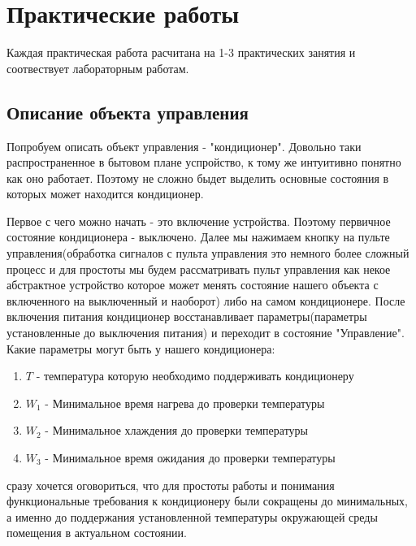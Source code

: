 \documentclass[12pt, twoside]{report}
\begin{document}
\newpage
\chapter*{Практические работы}\label{practical_works}

Каждая практическая работа расчитана на 1-3 практических занятия и соотвествует лабораторным работам.
\section*{Описание объекта управления}\label{practical_work_1}

Попробуем описать объект управления - "кондиционер". Довольно таки распространенное в бытовом плане успройство, к тому же
интуитивно понятно как оно работает. Поэтому не сложно быдет выделить основные состояния в которых может находится кондиционер.

Первое с чего можно начать - это включение устройства. Поэтому первичное состояние кондиционера - выключено. Далее мы нажимаем
кнопку на пульте управления(обработка сигналов с пульта управления это немного более сложный процесс и для простоты мы будем 
рассматривать пульт управления как некое абстрактное устройство которое может менять состояние нашего объекта с включенного на 
выключенный и наоборот) либо на самом кондиционере. После включения питания кондиционер восстанавливает параметры(параметры 
установленные до выключения питания) и переходит в состояние "Управление". Какие параметры могут быть у нашего кондиционера:
  \begin{enumerate}
    \item $T$ - температура которую необходимо поддерживать кондиционеру
    \item $W_1$ - Минимальное время нагрева до проверки температуры
    \item $W_2$ - Минимальное хлаждения до проверки температуры
    \item $W_3$ - Минимальное время ожидания до проверки  температуры
  \end{enumerate} 
сразу хочется оговориться, что для простоты работы и понимания функциональные требования к кондиционеру были сокращены до минимальных, а именно до
поддержания установленной температуры окружающей среды помещения в актуальном состоянии. 
\end{document}
